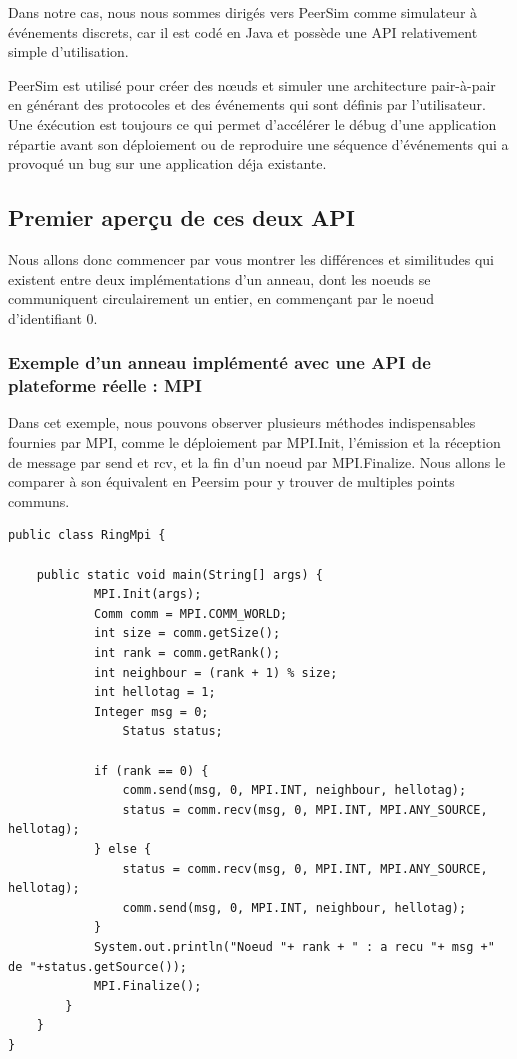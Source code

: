 \documentclass{article}
\begin{document}
					Dans notre cas, nous nous sommes dirigés vers PeerSim comme simulateur à événements discrets, car il est codé en Java et possède une API relativement simple d'utilisation.

					PeerSim est utilisé pour créer des nœuds et simuler une architecture pair-à-pair en générant des protocoles et des événements qui sont définis par l'utilisateur. Une éxécution est toujours ce qui permet d'accélérer le débug d'une application répartie avant son déploiement ou de reproduire une séquence d'événements qui a provoqué un bug sur une application déja existante.

			
			\newpage
			\subsection{Premier aperçu de ces deux API}
			\large{Nous allons donc commencer par vous montrer les différences et similitudes qui existent entre deux implémentations d'un anneau, dont les noeuds se communiquent circulairement un entier, en commençant par le noeud d'identifiant 0. }

			\subsubsection{Exemple d'un anneau implémenté avec une API de plateforme réelle : MPI}
			\large{Dans cet exemple, nous pouvons observer plusieurs méthodes indispensables fournies par MPI, comme le déploiement par MPI.Init, l'émission et la réception de message par send et rcv, et la fin d'un noeud par MPI.Finalize. Nous allons le comparer à son équivalent en Peersim pour y trouver de multiples points communs.}
			\begin{lstlisting}
public class RingMpi {

	public static void main(String[] args) {
			MPI.Init(args);
			Comm comm = MPI.COMM_WORLD;
			int size = comm.getSize();
			int rank = comm.getRank();
			int neighbour = (rank + 1) % size;
			int hellotag = 1;
			Integer msg = 0;
           		Status status;
            
			if (rank == 0) {
				comm.send(msg, 0, MPI.INT, neighbour, hellotag);
				status = comm.recv(msg, 0, MPI.INT, MPI.ANY_SOURCE, hellotag);
			} else {
				status = comm.recv(msg, 0, MPI.INT, MPI.ANY_SOURCE, hellotag);
				comm.send(msg, 0, MPI.INT, neighbour, hellotag);
            }
			System.out.println("Noeud "+ rank + " : a recu "+ msg +" de "+status.getSource());
			MPI.Finalize();
		}
	}
}
                	\end{lstlisting}
			
\end{document}
